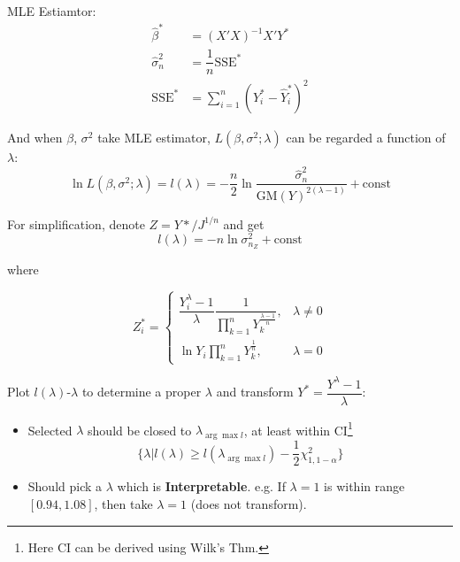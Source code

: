 \begin{itemize}[topsep=2pt,itemsep=2pt]
            
    
            MLE Estiamtor:
            \begin{align*}
                \hat{\beta }^*&= (X'X)^{-1}X'Y^*\\
                \hat{\sigma }^2_n&=\dfrac{1}{n}\mathrm{SSE}^*\\
                \mathrm{SSE}^*&=\sum_{i=1}^n(Y_i^*-\hat{Y}_i^*)^2
            \end{align*}
    
            And when $ \beta  $, $ \sigma ^2 $ take MLE estimator, $ L(\beta ,\sigma ^2;\lambda ) $ can be regarded a function of $ \lambda  $:
            \begin{equation}
                \ln L(\beta ,\sigma ^2;\lambda )=l(\lambda )=-\dfrac{n}{2}\ln \dfrac{\hat{\sigma}^2_n}{\mathrm{GM}(Y)^{2(\lambda -1)}}+\mathrm{const}
            \end{equation}
    
            For simplification, denote $ Z=Y*/J^{1/n} $ and get
            \begin{equation}
                l(\lambda )=-n\ln \sigma^2_{n_Z}+\mathrm{const} 
            \end{equation}
            
            where 
    
            \begin{equation}
                Z_i^* =\begin{cases}
                    \dfrac{Y_i^\lambda-1 }{\lambda }\dfrac{1}{\prod\limits_{k=1}^n Y_k^{\frac{\lambda -1}{n}}},&\lambda \neq 0\\
                    \ln Y_i\prod\limits_{k=1}^n Y_k^{\frac{1}{n}},&\lambda =0
                \end{cases}
            \end{equation}
    
            Plot $ l(\lambda ) $-$ \lambda  $ to determine a proper $ \lambda  $ and transform $ Y^*=\dfrac{Y^\lambda -1}{\lambda } $:
            \begin{itemize}[topsep=2pt,itemsep=2pt]
                \item Selected $ \lambda $ should be closed to $ \lambda_{\arg\max l} $, at least within CI\footnote{Here CI can be derived using Wilk's Thm.}
                \begin{equation}
                    \{\lambda |l(\lambda )\geq l(\lambda_{\arg\max l})-\dfrac{1}{2}\chi^2_{1,1-\alpha }\}
                \end{equation}
                \item Should pick a $ \lambda  $ which is \textbf{Interpretable}. e.g. If $ \lambda =1 $ is within range $ [0.94,1.08] $, then take $ \lambda =1 $ (does not transform).
                

\end{itemize}
\end{itemize}
